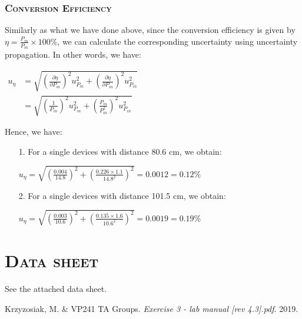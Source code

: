 \documentclass[a4paper,12pt]{article}
\begin{document}
\begin{appendices}
\subsubsection{\textsc{Conversion Efficiency}}
Similarly as what we have done above, since the conversion efficiency is given by $\displaystyle \eta = \frac{P_m}{P_{in}}\times 100\%$, we can calculate the corresponding uncertainty using uncertainty propagation. In other words, we have:
\begin{center}
$\begin{aligned} u_{\eta} &=\sqrt{\left(\frac{\partial \eta}{\partial P_{m}}\right)^{2} u_{P_{m}}^{2}+\left(\frac{\partial \eta}{\partial P_{i n}}\right)^{2} u_{P_{i n}}^{2}} \\ &=\sqrt{\left(\frac{1}{P_{i n}}\right)^{2} u_{P_{m}}^{2}+\left(\frac{P_{m}}{P_{i n}^{2}}\right)^{2} u_{P_{i n}}^{2} } \end{aligned}$
\end{center}
Hence, we have:
\begin{itemize}
\item[1.] For a single devices with distance 80.6 cm, we obtain:
			\begin{center}
			$\displaystyle  u_{\eta} = \sqrt{\left(\frac{0.004}{14.8}\right)^2 + \left(\frac{0.226\times 1.1}{14.8^2}\right)^2} = 0.0012 = 0.12 \%$ 
			\end{center}
\item[2.] For a single devices with distance 101.5 cm, we obtain:
			\begin{center}
			$\displaystyle  u_{\eta} = \sqrt{\left(\frac{0.003}{10.6}\right)^2 + \left(\frac{0.135\times 1.6}{10.6^2}\right)^2} = 0.0019 = 0.19 \%$ 
			\end{center}
\end{itemize}


\section{\textsc{Data sheet}} 
See the attached data sheet.
\end{appendices} 


\begin{thebibliography}{9}
 Krzyzosiak, M. \& VP241 TA Groups.
\textit{Exercise 3 - lab manual [rev 4.3].pdf}. 
2019.
\end{thebibliography}


\end{document}
